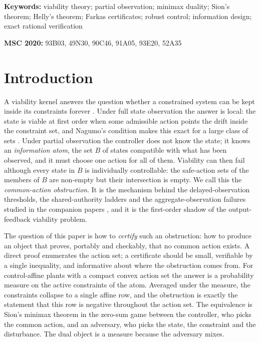 \documentclass[11pt,a4paper]{article}
\theoremstyle{plain}
\theoremstyle{definition}
\theoremstyle{remark}
\newcommand{\tfr}[2]{\tfrac{#1}{#2}}
\begin{document}
\begin{abstract}
finite-horizon trajectories with adapted controls reproduces the review threshold $\tau^\ast=\tfr{7}{50}$ of a companion instance. Every number is regenerated by an exact rational script ($66$ checks); the soundness direction, the parity gap and the benchmark algebra are machine-checked in Lean~4.
\end{abstract}

\medskip
\noindent\textbf{Keywords:} viability theory; partial observation; minimax duality; Sion's theorem; Helly's theorem; Farkas certificates; robust control; information design; exact rational verification

\medskip
\noindent\textbf{MSC 2020:} 93B03, 49N30, 90C46, 91A05, 93E20, 52A35
\section{Introduction}\label{sec:intro}

A viability kernel answers the question whether a constrained system can be kept inside its constraints forever \cite{Aubin1991,Aubin2011,Blanchini1999}. Under full state observation the answer is local: the state is viable at first order when some admissible action points the drift inside the constraint set, and Nagumo's condition makes this exact for a large class of sets \cite{Nagumo1942}. Under partial observation the controller does not know the state; it knows an \emph{information atom}, the set $B$ of states compatible with what has been observed, and it must choose one action for all of them. Viability can then fail although every state in $B$ is individually controllable: the safe-action sets of the members of $B$ are non-empty but their intersection is empty. We call this the \emph{common-action obstruction}. It is the mechanism behind the delayed-observation thresholds, the shared-authority ladders and the aggregate-observation failures studied in the companion papers \cite{Abaee2026calc,Abaee2026cert,Abaee2026prob}, and it is the first-order shadow of the output-feedback viability problem.

The question of this paper is how to \emph{certify} such an obstruction: how to produce an object that proves, portably and checkably, that no common action exists. A direct proof enumerates the action set; a certificate should be small, verifiable by a single inequality, and informative about where the obstruction comes from. For control-affine plants with a compact convex action set the answer is a probability measure on the active constraints of the atom. Averaged under the measure, the constraints collapse to a single affine row, and the obstruction is exactly the statement that this row is negative throughout the action set. The equivalence is Sion's minimax theorem in the zero-sum game between the controller, who picks the common action, and an adversary, who picks the state, the constraint and the disturbance. The dual object is a measure because the adversary mixes.
\end{document}
